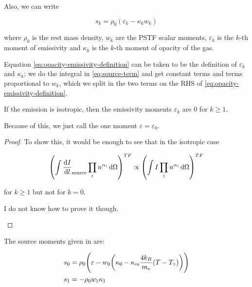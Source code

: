 \documentclass[main.tex]{subfiles}
\begin{document}
Also, we can write

\begin{equation} \label{eq:opacity-emissivity-definition}
  s_k = \rho_0 (\varepsilon_k - \kappa_k w_k)
\end{equation}

where \(\rho_0\) is the rest mass density, \(w_k\) are the PSTF scalar moments, \(\varepsilon_k\) is the \(k\)-th moment of emissivity and \(\kappa_k\) is the \(k\)-th moment of opacity of the gas.

Equation \eqref{eq:opacity-emissivity-definition} can be taken to be the definition of \(\varepsilon_k\) and \(\kappa_k\); we do the integral in \eqref{eq:source-term} and get constant terms and terms proportional to \(w_k\), which we split in the two terms on the RHS of \eqref{eq:opacity-emissivity-definition}.

\begin{claim}
    If the emission is isotropic, then the emissivity moments \(\varepsilon_k\) are 0 for \(k \geq 1\).
\end{claim}

Because of this, we just call the one moment \(\varepsilon = \varepsilon_0\).

\begin{proof}
    To show this, it would be enough to see that in the isotropic case

    \begin{equation}
        \qty(\int \dv{I}{l}_{\text{source}} \prod_i n^{\alpha_i} \dd{\Omega})^{TF}
        \propto \qty(\int I \prod_i n^{\alpha_i} \dd{\Omega})^{TF}
    \end{equation}

    for \(k \geq 1\) but not for \(k = 0\).

    \begin{greenbox}
      I do not know how to prove it though.
    \end{greenbox}
\end{proof}

The source moments given in \cite[eq. 6]{NobiliTurollaZampieri:1991dec} are:

\begin{subequations}
\begin{align}
  s_0 &= \rho_0 \qty(\varepsilon - w_0 \qty(\kappa_0 - \kappa_{\text{es}} \frac{4 k_B}{m_e} (T - T_\gamma)))  \\
  s_1 &= - \rho_0 w_1 \kappa_1
\end{align}
\end{subequations}
\end{document}
